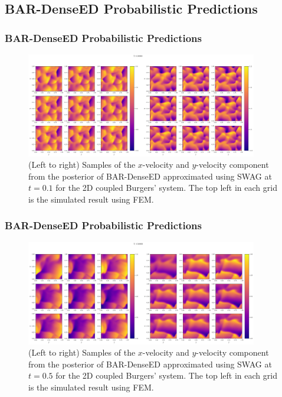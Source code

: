 \documentclass{beamer}
\theoremstyle{remark}
\begin{document}
\subsection{BAR-DenseED Probabilistic Predictions}

\begin{frame}
\frametitle{BAR-DenseED Probabilistic Predictions}
%
\begin{figure}[H]
    \centering
    \includegraphics[trim={0 0 0 1cm}, clip, width=0.9\textwidth]{Fig21.png}
    \caption{(Left to right) Samples of the $x$-velocity and $y$-velocity component from the posterior of BAR-DenseED approximated using SWAG at $t=0.1$ for the 2D coupled Burgers' system. The top left in each grid is the simulated result using FEM.} 
    \label{fig:burgers2D-bar-samples-1}
\end{figure}
\end{frame}

\begin{frame}
\frametitle{BAR-DenseED Probabilistic Predictions}
\begin{figure}[H]
    \centering
    \includegraphics[trim={0 0 0 1cm}, clip, width=0.9\textwidth]{Fig22.png}
    \caption{(Left to right) Samples of the $x$-velocity and $y$-velocity component from the posterior of BAR-DenseED approximated using SWAG at $t=0.5$ for the 2D coupled Burgers' system. The top left in each grid is the simulated result using FEM.} 
    \label{fig:burgers2D-bar-samples-2}
\end{figure}
\end{frame}
\end{document}
